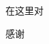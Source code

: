 

\begin{ack}
\begin{normalsize}
  \begin{spacing}{1.4}

在这里对

感谢

\end{spacing}
\end{normalsize}
\end{ack}
